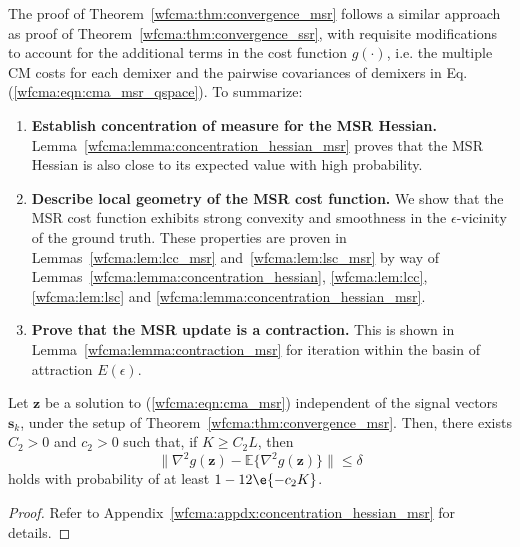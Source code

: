 The proof of Theorem~\ref{wfcma:thm:convergence_msr} follows a similar approach as
proof of Theorem~\ref{wfcma:thm:convergence_ssr}, 
with requisite modifications to account for the additional terms 
in the cost function $g(\cdot)$, i.e. the multiple 
CM costs for each demixer 
and the pairwise covariances of demixers in Eq.(\ref{wfcma:eqn:cma_msr_qspace}). To summarize:
\begin{enumerate}
\item {\bf Establish concentration of measure for the MSR Hessian.} Lemma~\ref{wfcma:lemma:concentration_hessian_msr} proves that the MSR Hessian is also close to its expected value with high probability.%
\item {\bf Describe local geometry of the MSR cost function.} We show that the MSR cost function exhibits strong convexity and smoothness in the $\epsilon$-vicinity of the ground truth. These properties are proven in Lemmas~\ref{wfcma:lem:lcc_msr} and~\ref{wfcma:lem:lsc_msr} by way of Lemmas~\ref{wfcma:lemma:concentration_hessian}, \ref{wfcma:lem:lcc}, \ref{wfcma:lem:lsc} and \ref{wfcma:lemma:concentration_hessian_msr}. 
\item {\bf Prove that the MSR update is a contraction.} This is shown in Lemma~\ref{wfcma:lemma:contraction_msr} for iteration within the basin of attraction $E(\epsilon)$. 
\end{enumerate}

\begin{lem} \label{wfcma:lemma:concentration_hessian_msr} 
Let $\bm{z}$ be a solution to (\ref{wfcma:eqn:cma_msr}) independent of the signal vectors $\bm{s}_k$, under the setup of Theorem~\ref{wfcma:thm:convergence_msr}. Then, there exists $C_2>0$ and $c_2>0$ such that, if $K\geq C_2 L$, then
\begin{equation}
	\big\|\nabla^2 g(\bm{z}) - \mathbb{E}\{\nabla^2 g(\bm{z})\}\big\| \leq \delta \label{wfcma:eqn:concentration_hessian_msr}
\end{equation}
holds with probability of at least $1 -12\e{-c_2K}$.
\end{lem}
\begin{proof}
	Refer to Appendix~\ref{wfcma:appdx:concentration_hessian_msr} for details.
\end{proof} 

